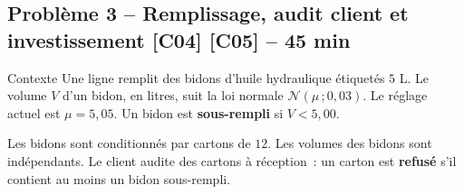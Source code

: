 \documentclass[a4paper,11pt]{article}
\newcommand{\duree}[1]{\hfill{\normalsize\color{uimmred}#1}}
\begin{document}
\newpage
\subsection{Problème 3 -- Remplissage, audit client et investissement \duree{[C04] [C05] -- 45 min}}

\begin{exo}{Contexte}
Une ligne remplit des bidons d'huile hydraulique étiquetés $5$ L. Le volume $V$ d'un bidon, en litres, suit la loi normale $\mathcal{N}(\mu\,;0{,}03)$. Le réglage actuel est $\mu = 5{,}05$. Un bidon est \textbf{sous-rempli} si $V < 5{,}00$.

Les bidons sont conditionnés par cartons de $12$. Les volumes des bidons sont indépendants. Le client audite des cartons à réception~: un carton est \textbf{refusé} s'il contient au moins un bidon sous-rempli.
\end{exo}
\end{document}
